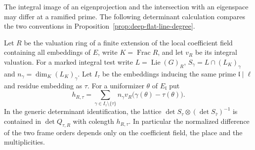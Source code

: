 The integral image of an eigenprojection and the intersection with an
eigenspace may differ at a ramified prime. The following determinant
calculation compares the two conventions in
Proposition~\ref{prop:deep-flat-line-degree}.

\begin{auxlemma}
\label{lem:projected-lie-frame-index}
Let \(R\) be the valuation ring of a finite extension of the local
coefficient field containing all embeddings of \(E\), write
\(K=\operatorname{Frac}R\), and let \(v_R\) be its integral valuation.
For a marked integral test write \(L=\operatorname{Lie}(G)_R\),
\(S_\gamma=L\cap(L_K)_\gamma\) and
\(n_\gamma=\dim_K(L_K)_\gamma\).
Let \(I_\tau\) be the embeddings inducing the same prime
\(\mathfrak l\mid\ell\) and residue embedding as \(\tau\).
For a uniformizer \(\theta\) of \(E_{\mathfrak l}\) put
\[
 h_{R,\tau}=\sum_{\gamma\in I_\tau\setminus\{\tau\}}
        n_\gamma v_R\bigl(\gamma(\theta)-\tau(\theta)\bigr).
\]
In the generic determinant identification, the lattice
\(\det S_\tau\otimes(\det S_{\bar\tau})^{-1}\) is contained in
\(\det Q_{\tau,R}\) with colength \(h_{R,\tau}\). In particular
the normalized difference of the two frame orders depends only on the
coefficient field, the place and the multiplicities.
\end{auxlemma}

